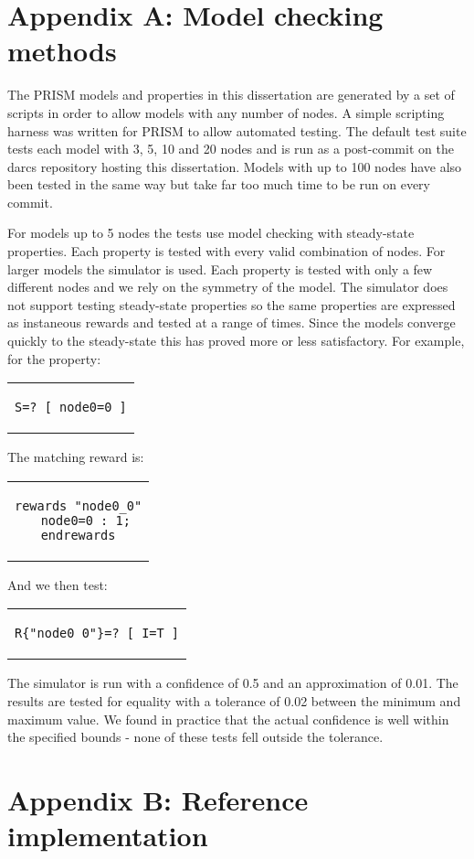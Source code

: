 \documentclass[a4paper,10pt]{article}
\newenvironment{prismprop}[0]{
  \begin{center}
  \begin{tabular}{c}
  \footnotesize
}{
  \end{tabular}
  \end{center}
}
\begin{document}
\section{Appendix A: Model checking methods}

The PRISM models and properties in this dissertation are generated by a set of scripts in order to allow models with any number of nodes. A simple scripting harness was written for PRISM to allow automated testing. The default test suite tests each model with 3, 5, 10 and 20 nodes and is run as a post-commit on the darcs repository hosting this dissertation. Models with up to 100 nodes have also been tested in the same way but take far too much time to be run on every commit. 

For models up to 5 nodes the tests use model checking with steady-state properties. Each property is tested with every valid combination of nodes. For larger models the simulator is used. Each property is tested with only a few different nodes and we rely on the symmetry of the model. The simulator does not support testing steady-state properties so the same properties are expressed as instaneous rewards and tested at a range of times. Since the models converge quickly to the steady-state this has proved more or less satisfactory. For example, for the property:

\begin{prismprop}
\begin{lstlisting}
S=? [ node0=0 ]
\end{lstlisting}
\end{prismprop}

\noindent The matching reward is:

\begin{prismprop}
\begin{lstlisting}
rewards "node0_0"
  node0=0 : 1;
endrewards
\end{lstlisting}
\end{prismprop}

\noindent And we then test:

\begin{prismprop}
\begin{lstlisting}
R{"node0_0"}=? [ I=T ]
\end{lstlisting}
\end{prismprop}

The simulator is run with a confidence of 0.5 and an approximation of 0.01. The results are tested for equality with a tolerance of 0.02 between the minimum and maximum value. We found in practice that the actual confidence is well within the specified bounds - none of these tests fell outside the tolerance.

\section{Appendix B: Reference implementation}



\end{document}
